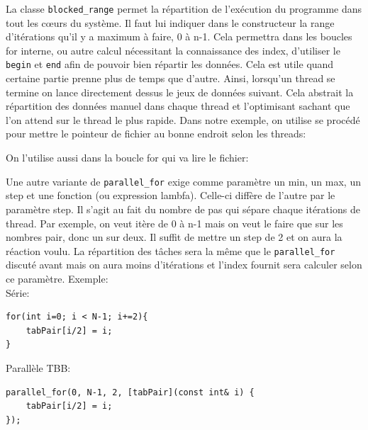 \documentclass[10pt,a4paper]{article}
\begin{document}
La classe \texttt{blocked\_range} permet la répartition de l'exécution du programme dans tout les cœurs du système. Il faut lui indiquer dans le constructeur la range d'itérations qu'il y a maximum à faire, 0 à n-1. Cela permettra dans les boucles for interne, ou autre calcul nécessitant la connaissance des index, d'utiliser le \texttt{begin} et \texttt{end} afin de pouvoir bien répartir les données. Cela est utile quand certaine partie prenne plus de temps que d'autre. Ainsi, lorsqu'un thread se termine on lance directement dessus le jeux de données suivant.
Cela abstrait la répartition des données manuel dans chaque thread et l'optimisant sachant que l'on attend sur le thread le plus rapide. Dans notre exemple, on utilise se procédé pour mettre le pointeur de fichier au bonne endroit selon les threads:

On l'utilise aussi dans la boucle for qui va lire le fichier:


\newpage

Une autre variante de \texttt{parallel\_for} exige comme paramètre un min, un max, un step et une fonction (ou expression lambfa). Celle-ci diffère de l'autre par le paramètre step. Il s'agit au fait du nombre de pas qui sépare chaque itérations de thread. Par exemple, on veut itère de 0 à n-1 mais on veut le faire que sur les nombres pair, donc un sur deux. Il suffit de mettre un step de 2 et on aura la réaction voulu. La répartition des tâches sera la même que le \texttt{parallel\_for} discuté avant mais on aura moins d'itérations et l'index fournit sera calculer selon ce paramètre. Exemple:\\
Série:

\begin{lstlisting}
for(int i=0; i < N-1; i+=2){
	tabPair[i/2] = i;
}
\end{lstlisting}

Parallèle TBB:

\begin{lstlisting}
parallel_for(0, N-1, 2, [tabPair](const int& i) {
	tabPair[i/2] = i;
});
\end{lstlisting}
\end{document}
